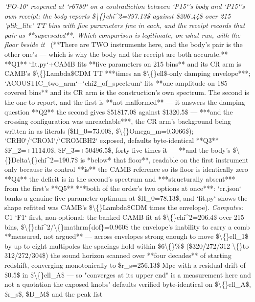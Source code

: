\begin{description}
\textit{`PO-10` reopened at `r6780` on a contradiction between `P15`'s body and `P15`'s own receipt: the body reports \$\textbackslash\{\}chi\textasciicircum{}2=397.13\$ against \$206.44\$ over 215 `plik\_lite` TT bins with five parameters free in each, and the receipt records that pair as **superseded**. Which comparison is legitimate, on what run, with the floor beside it} \ (**There are TWO instruments here, and the body's pair is the other one's --- which is why the body and the receipt are both accurate.**  **Q1** `fit.py`+CAMB fits **five parameters on 215 bins** and its CR arm is CAMB's \$\textbackslash\{\}Lambda\$CDM TT ***times an \$\textbackslash\{\}ell\$-only damping envelope***; `ACOUSTIC\_two\_arm`+`chi2\_of\_spectrum` fits **one amplitude on 185 covered bins** and its CR arm is the construction's own spectrum. The second is the one to report, and the first is **not malformed** --- it answers the damping question  **Q2** the second gives \$51817.0\$ against \$1320.5\$ --- ***and the crossing configuration was unreachable***, the CR arm's background being written in as literals (\$H\_0=73.00\$, \$\textbackslash\{\}Omega\_m=0.3066\$); `CRH0`/`CROM`/`CROMBH2` exposed, defaults byte-identical  **Q3** \$F\_2=+1114.0\$, \$F\_3=+50496.5\$, forty-five times it --- **and the body's \$\textbackslash\{\}Delta\textbackslash\{\}chi\textasciicircum{}2=190.7\$ is *below* that floor**, readable on the first instrument only because its control **is** the CAMB reference so its floor is identically zero  **Q4** the deficit is in the second's spectrum and ***structurally absent*** from the first's  **Q5** ***both of the order's two options at once***: `cr.json` banks a genuine five-parameter optimum at \$H\_0=78.13\$, and `fit.py` shows the shape refitted was CAMB's \$\textbackslash\{\}Lambda\$CDM times the envelope). 
\emph{Computes:} C1 `F1` first, non-optional: the banked CAMB fit at \$\textbackslash\{\}chi\textasciicircum{}2=206.4\$ over 215 bins, \$\textbackslash\{\}chi\textasciicircum{}2/\textbackslash\{\}mathrm\{dof\}=0.960\$  the envelope's inability to carry a comb **measured, not argued** --- across envelopes strong enough to move \$\textbackslash\{\}ell\_1\$ by up to eight multipoles the spacings hold within \$6\textbackslash\{\}\%\$ (\$320/272/312 \textbackslash\{\}to 312/272/304\$)  the sound horizon scanned over **four decades** of starting redshift, converging monotonically to \$r\_s=256.13\$ Mpc with a residual drift of \$0.5\$ in \$\textbackslash\{\}ell\_A\$ --- so "converges at its upper end" is a measurement here and not a quotation  the exposed knobs' defaults verified byte-identical on \$\textbackslash\{\}ell\_A\$, \$r\_s\$, \$D\_M\$ and the peak list

\end{description}
